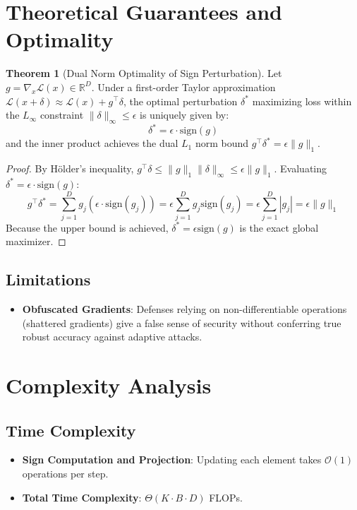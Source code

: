 \documentclass[11pt,a4paper]{article}
\theoremstyle{definition}
\newtheorem{theorem}{Theorem}[section]
\begin{document}
\section{Theoretical Guarantees and Optimality}

\begin{theorem}[Dual Norm Optimality of Sign Perturbation]
Let $g = \nabla_x \mathcal{L}(x) \in \mathbb{R}^D$. Under a first-order Taylor approximation $\mathcal{L}(x + \delta) \approx \mathcal{L}(x) + g^\top \delta$, the optimal perturbation $\delta^*$ maximizing loss within the $L_\infty$ constraint $\|\delta\|_\infty \le \epsilon$ is uniquely given by:
\begin{equation}
\delta^* = \epsilon \cdot \text{sign}(g)
\end{equation}
and the inner product achieves the dual $L_1$ norm bound $g^\top \delta^* = \epsilon \|g\|_1$.
\end{theorem}

\begin{proof}
By Hölder's inequality, $g^\top \delta \le \|g\|_1 \|\delta\|_\infty \le \epsilon \|g\|_1$.
Evaluating $\delta^* = \epsilon \cdot \text{sign}(g)$:
\begin{equation}
g^\top \delta^* = \sum_{j=1}^D g_j (\epsilon \cdot \text{sign}(g_j)) = \epsilon \sum_{j=1}^D g_j \text{sign}(g_j) = \epsilon \sum_{j=1}^D |g_j| = \epsilon \|g\|_1
\end{equation}
Because the upper bound is achieved, $\delta^* = \epsilon \text{sign}(g)$ is the exact global maximizer.
\end{proof}

\subsection{Limitations}
\begin{itemize}
    \item \textbf{Obfuscated Gradients}: Defenses relying on non-differentiable operations (shattered gradients) give a false sense of security without conferring true robust accuracy against adaptive attacks.
\end{itemize}

\section{Complexity Analysis}

\subsection{Time Complexity}
\begin{itemize}
    \item \textbf{Sign Computation and Projection}: Updating each element takes $\mathcal{O}(1)$ operations per step.
    \item \textbf{Total Time Complexity}: $\Theta(K \cdot B \cdot D)$ FLOPs.
\end{itemize}
\end{document}
